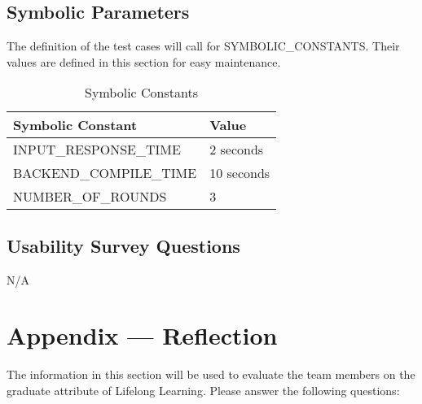 \documentclass[12pt, titlepage]{article}
\begin{document}
\subsection{Symbolic Parameters}

The definition of the test cases will call for SYMBOLIC\_CONSTANTS.
Their values are defined in this section for easy maintenance.

\begin{table}[H]
    \begin{tabularx}{\textwidth}{ | p{6cm} | p{6.85cm} | }
    \hline
    Symbolic Constant & Value \\
    \hline
    INPUT\_RESPONSE\_TIME & 2 seconds \\
    \hline
    BACKEND\_COMPILE\_TIME & 10 seconds \\
    \hline
    NUMBER\_OF\_ROUNDS & 3 \\
    \hline
    \end{tabularx}
    \caption{Symbolic Constants}
    \label{tab:trace}
\end{table}

\subsection{Usability Survey Questions}

N/A

\newpage{}
\section*{Appendix --- Reflection}

The information in this section will be used to evaluate the team members on the
graduate attribute of Lifelong Learning.  Please answer the following questions:
\end{document}
